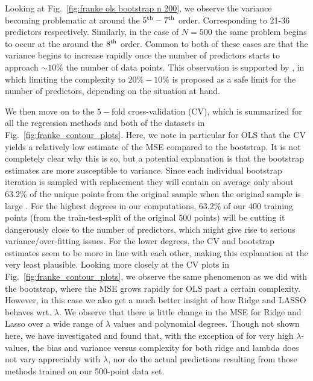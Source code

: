 \documentclass[reprint, english, nofootinbib]{revtex4-2}
\begin{document}
Looking at Fig.~\ref{fig:franke ols bootstrap n 200}, we observe the variance becoming problematic at around the $5^{\textup{th}}-7^{\textup{th}}$ order. Corresponding to 21-36 predictors respectively. Similarly, in the case of $N=500$ the same problem begins to occur at the around the $8^{\textup{th}}$ order. Common to both of these cases are that the variance begins to increase rapidly once the number of predictors starts to approach $\sim 10\%$ the number of data points. This observation is supported by \textcite{Harell}, in which limiting the complexity to $20\%-10\%$ is proposed as a safe limit for the number of predictors, depending on the situation at hand.

We then move on to the $5-$fold cross-validation (CV), which is summarized for all the regression methods and both of the datasets in Fig.~\ref{fig:franke_contour_plots}.
Here, we note in particular for OLS that the CV yields a relatively low estimate of the MSE compared to the bootstrap. It is not completely clear why this is so, but a potential explanation is that the bootstrap estimates are more susceptible to variance. Since each individual bootstrap iteration is sampled with replacement they will contain on average only about 63.2\% of the unique points from the original sample when the original sample is large \cite{hastie}. For the highest degrees in our computations, 63.2\% of our 400 training points (from the train-test-split of the original 500 points)  will be cutting it dangerously close to the number of predictors, which might give rise to serious variance/over-fitting issues. For the lower degrees, the CV and bootstrap estimates seem to be more in line with each other, making this explanation at the very least plausible.
Looking more closely at the CV plots in Fig.~\ref{fig:franke_contour_plots}, we observe the same phenomenon as we did with the bootstrap, where the MSE grows rapidly for OLS past a certain complexity. However, in this case we also get a much better insight of how Ridge and LASSO behaves wrt. $\lambda$. We observe that there is little change in the MSE for Ridge and Lasso over a wide range of $\lambda$ values and polynomial degrees. Though not shown here, we have investigated and found that, with the exception of for very high $\lambda$-values, the bias and variance versus complexity for both ridge and lambda does not vary appreciably with $\lambda$, nor do the actual predictions resulting from those methods trained on our 500-point data set.
\end{document}
